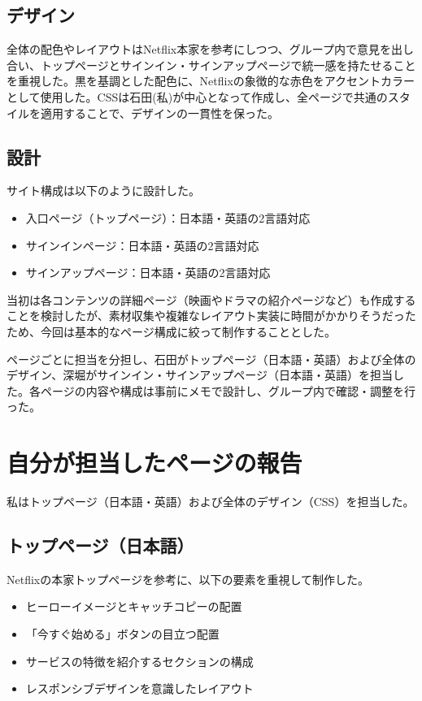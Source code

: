 \documentclass[12pt,a4j]{jarticle}
\begin{document}
\subsection{デザイン}
全体の配色やレイアウトはNetflix本家を参考にしつつ、グループ内で意見を出し合い、トップページとサインイン・サインアップページで統一感を持たせることを重視した。黒を基調とした配色に、Netflixの象徴的な赤色をアクセントカラーとして使用した。CSSは石田(私)が中心となって作成し、全ページで共通のスタイルを適用することで、デザインの一貫性を保った。

\subsection{設計}
サイト構成は以下のように設計した。
\begin{itemize}
\item 入口ページ（トップページ）：日本語・英語の2言語対応
\item サインインページ：日本語・英語の2言語対応
\item サインアップページ：日本語・英語の2言語対応
\end{itemize}

当初は各コンテンツの詳細ページ（映画やドラマの紹介ページなど）も作成することを検討したが、素材収集や複雑なレイアウト実装に時間がかかりそうだったため、今回は基本的なページ構成に絞って制作することとした。

ページごとに担当を分担し、石田がトップページ（日本語・英語）および全体のデザイン、深堀がサインイン・サインアップページ（日本語・英語）を担当した。各ページの内容や構成は事前にメモで設計し、グループ内で確認・調整を行った。

\section{自分が担当したページの報告}
私はトップページ（日本語・英語）および全体のデザイン（CSS）を担当した。

\subsection{トップページ（日本語）}
Netflixの本家トップページを参考に、以下の要素を重視して制作した。
\begin{itemize}
\item ヒーローイメージとキャッチコピーの配置
\item 「今すぐ始める」ボタンの目立つ配置
\item サービスの特徴を紹介するセクションの構成
\item レスポンシブデザインを意識したレイアウト
\end{itemize}
\end{document}
